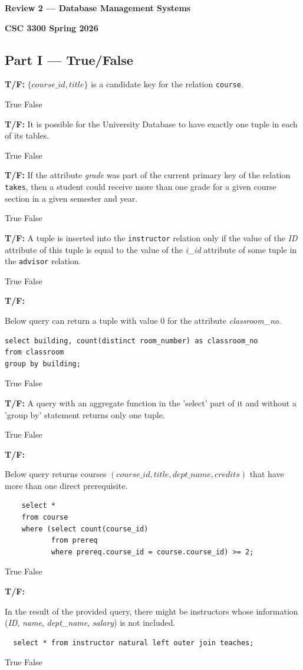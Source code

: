 \documentclass[12pt]{exam}
\makeatletter
\newcommand{\tfq}[3]{%
  \question[#1]\textbf{T/F:} #2%
  \ifprintanswers
    \par\begin{oneparchoices}
      #3
    \end{oneparchoices}
  \fi
}
\newcommand{\TFQ@choices}{} %
\newenvironment{tfqverb}[2]{%
  \def\TFQ@choices{#2}%
  \question[#1]\textbf{T/F:}%
}{%
  \ifprintanswers
    \par\begin{oneparchoices}\TFQ@choices\end{oneparchoices}
  \fi
}
\makeatother
\begin{document}
\begin{center}
\textbf{\Large Review 2 — Database Management Systems}

\textbf{CSC 3300 \quad Spring 2026}
\end{center}

\begin{questions}
\section*{Part I — True/False}
\tfq{2}{$\{course\_id, title\}$ is a candidate key for the relation \texttt{course}.}{\choice True \CorrectChoice False}
\tfq{3}{It is possible for the University Database to have exactly one tuple in each of its tables.}{\CorrectChoice True \choice False}
\tfq{3}{If the attribute \textit{grade} was part of the current primary key of the relation \texttt{takes}, then a student could receive more than one grade for a given course section in a given semester and year.}{\CorrectChoice True \choice False}
\tfq{3}{A tuple is inserted into the \texttt{instructor} relation only if the value of the \textit{ID} attribute of this tuple is equal to the value of the \textit{i\_id} attribute of some tuple in the \texttt{advisor} relation.}{\choice True \CorrectChoice False}
\begin{tfqverb}{3}{\choice True \CorrectChoice False}
Below query can return a tuple with value 0 for the attribute \textit{classroom\_no}.

\begin{verbatim}
select building, count(distinct room_number) as classroom_no
from classroom
group by building;
\end{verbatim}
\end{tfqverb}

  \tfq{3}{A query with an aggregate function in the 'select' part of it and without a 'group by' statement returns only one tuple.}{\CorrectChoice True \choice False}
  \begin{tfqverb}{3}{\CorrectChoice True \choice False}
  Below query returns courses \((\mathit{course\_id}, \mathit{title}, \mathit{dept\_name}, \mathit{credits})\) that have more than one direct prerequisite.
  \begin{verbatim}
    select * 
    from course 
    where (select count(course_id) 
           from prereq 
           where prereq.course_id = course.course_id) >= 2;
  \end{verbatim}
  \end{tfqverb}
  \begin{tfqverb}{3}{\CorrectChoice True \choice False}
  In the result of the provided query, there might be instructors whose information (\textit{ID}, \textit{name}, \textit{dept\_name}, \textit{salary}) is not included.
  \begin{verbatim}
  select * from instructor natural left outer join teaches;
  \end{verbatim}
  \end{tfqverb}


\end{questions}
\end{document}
